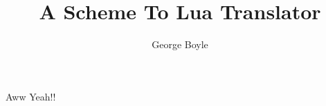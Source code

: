\documentclass{report}
\begin{document}
\title{A Scheme To Lua Translator}
\author{George Boyle}
\maketitle

Aww Yeah!!
\end{document}
